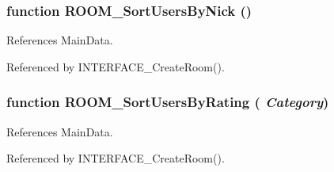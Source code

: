 \subsubsection{\setlength{\rightskip}{0pt plus 5cm}function ROOM\_\-SortUsersByNick ()}\label{room_2room_8js_bf8006e7555a26d703c26d5251381d96}




References MainData.

Referenced by INTERFACE\_\-CreateRoom().
\subsubsection{\setlength{\rightskip}{0pt plus 5cm}function ROOM\_\-SortUsersByRating ( {\em Category})}\label{room_2room_8js_99971ae4c58178caa43079c9214db58d}




References MainData.

Referenced by INTERFACE\_\-CreateRoom().